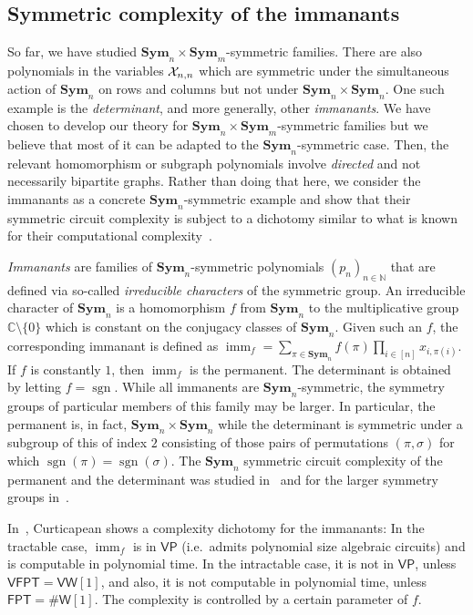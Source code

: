 \documentclass[11pt, DIV=15]{scrarticle}
\theoremstyle{definition}
\theoremstyle{plain}
\theoremstyle{remark}
\newcommand{\Xx}{{\cal X}}
\newcommand{\Sym}{\mathbf{Sym}}
\newcommand{\bbN}{\mathbb{N}}
\DeclareMathOperator{\imm}{imm}
\DeclareMathOperator{\sgn}{sgn}
\newcommand{\VP}{\mathsf{VP}}
\newcommand{\VFPT}{\mathsf{VFPT}}
\newcommand{\VW}{\mathsf{VW}[1]}
\newcommand{\FPT}{\mathsf{FPT}}
\newcommand{\sharpW}{\#\mathsf{W}[1]}
\begin{document}
\subsection{Symmetric complexity of the immanants}
So far, we have studied $\Sym_n \times \Sym_m$-symmetric families. There are also polynomials in the variables $\Xx_{n,n}$ which are symmetric under the simultaneous action of $\Sym_n$ on rows and columns but not under $\Sym_n \times \Sym_n$.  One such example is the \emph{determinant}, and more generally, other \emph{immanants}. 
We have chosen to develop our theory for $\Sym_n \times
\Sym_m$-symmetric families but we believe that most of it can be
adapted to the $\Sym_n$-symmetric case. Then, the relevant
homomorphism or subgraph polynomials involve \emph{directed} and not
necessarily bipartite graphs. Rather than doing that here, we consider
the immanants as a concrete $\Sym_n$-symmetric example and show that
their symmetric circuit complexity is subject to a dichotomy similar
to what is known for their computational complexity~\cite{curticapean2021full}.  
 
\emph{Immanants} are families of $\Sym_n$-symmetric polynomials
$(p_n)_{n \in \bbN}$ that are defined via so-called \emph{irreducible
  characters} of the symmetric group. An irreducible character of
$\Sym_n$ is a homomorphism $f$ from $\Sym_n$ to the multiplicative group
$\mathbb{C}\setminus\{0\}$ which is constant on the conjugacy classes
of $\Sym_n$.  Given such an $f$, the corresponding immanant is defined as
$
\imm_{f} = \sum_{\pi \in \Sym_n} f(\pi) \prod_{i \in [n]} x_{i,\pi(i)}.
$
If $f$ is constantly $1$, then $\imm_f$ is the permanent. The
determinant is obtained by letting $f = \sgn$.  While all immanents are
$\Sym_n$-symmetric, the symmetry groups of particular members of this
family may be larger.  In particular, the permanent is, in fact,
$\Sym_n \times \Sym_n$ while the determinant is symmetric under a
subgroup of this of index $2$ consisting of those pairs of
permutations $(\pi,\sigma)$ for which $\sgn(\pi) = \sgn(\sigma)$.  The
$\Sym_n$ symmetric circuit complexity of the permanent and the determinant was
studied in~\cite{dawar_symmetric_2025} and for the larger symmetry
groups in~\cite{dawar2021lower}.

In~\cite{curticapean2021full}, Curticapean shows a complexity dichotomy for the immanants: In the tractable case, $\imm_{f}$ is in $\VP$ (i.e.\ admits polynomial size algebraic circuits) and is computable in polynomial time. In the intractable case, it is not in $\VP$, unless $\VFPT = \VW$, and also, it is not computable in polynomial time, unless $\FPT = \sharpW$. The complexity is controlled by a certain parameter of $f$. 
\end{document}
